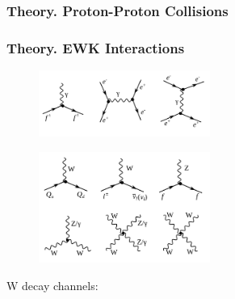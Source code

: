 \begin{frame}\frametitle{Theory. Proton-Proton Collisions}
\end{frame}%

\begin{frame}\frametitle{Theory. EWK Interactions}

\begin{figure}[htb]
  \begin{center}
    {\includegraphics[width=0.50\textwidth]{../figs/Intro/feynmEM.png}}
    \label{fig:feynmEM}
  \end{center}
\end{figure}

\begin{figure}[htb]
  \begin{center}
    {\includegraphics[width=0.50\textwidth]{../figs/Intro/feynmW.png}}
    \label{fig:feynmW}
  \end{center}
\end{figure}

  \scriptsize
   W decay channels:

\end{frame}%


